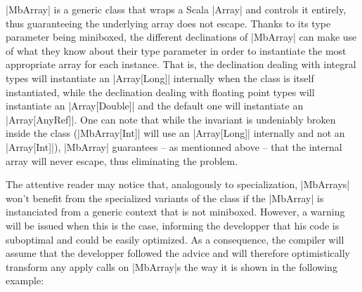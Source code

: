 



|MbArray| is a generic class that wraps a Scala |Array| and controls it entirely, thus guaranteeing the underlying array does not escape. Thanks to its type parameter being miniboxed, the different declinations of |MbArray| can make use of what they know about their type parameter in order to instantiate the most appropriate array for each instance. That is, the declination dealing with integral types will instantiate an |Array[Long]| internally when the class is itself instantiated, while the declination dealing with floating point types will instantiate an |Array[Double]| and the default one will instantiate an |Array[AnyRef]|. One can note that while the invariant is undeniably broken inside the class (|MbArray[Int]| will use an |Array[Long]| internally and not an |Array[Int]|), |MbArray| guarantees -- as mentionned above -- that the internal array will never escape, thus eliminating the problem. 

The attentive reader may notice that, analogously to specialization, |MbArrays| won't benefit from the specialized variants of the class if the |MbArray| is instanciated from a generic context that is not miniboxed. However, a warning will be issued when this is the case, informing the developper that his code is suboptimal and could be easily optimized. As a consequence, the compiler will assume that the developper followed the advice and will therefore optimistically transform any apply calls on |MbArray|s the way it is shown in the following example:


